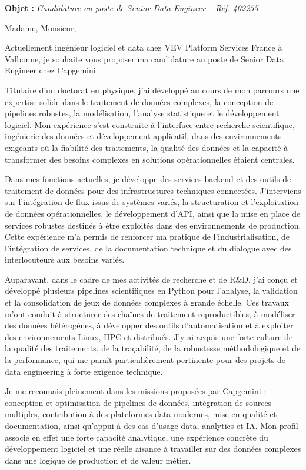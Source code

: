 \documentclass[11pt,a4paper]{altacv}
\begin{document}
\makecvheader

{\color{accent}\textbf{Objet :}} \textit{Candidature au poste de Senior Data Engineer -- Réf. 402255}

{\color{body}

Madame, Monsieur,

Actuellement ingénieur logiciel et data chez VEV Platform Services France à Valbonne, je souhaite vous proposer ma candidature au poste de Senior Data Engineer chez Capgemini.

Titulaire d’un doctorat en physique, j’ai développé au cours de mon parcours une expertise solide dans le traitement de données complexes, la conception de pipelines robustes, la modélisation, l’analyse statistique et le développement logiciel. Mon expérience s’est construite à l’interface entre recherche scientifique, ingénierie des données et développement applicatif, dans des environnements exigeants où la fiabilité des traitements, la qualité des données et la capacité à transformer des besoins complexes en solutions opérationnelles étaient centrales.

Dans mes fonctions actuelles, je développe des services backend et des outils de traitement de données pour des infrastructures techniques connectées. J’interviens sur l’intégration de flux issus de systèmes variés, la structuration et l’exploitation de données opérationnelles, le développement d’API, ainsi que la mise en place de services robustes destinés à être exploités dans des environnements de production. Cette expérience m’a permis de renforcer ma pratique de l’industrialisation, de l’intégration de services, de la documentation technique et du dialogue avec des interlocuteurs aux besoins variés.

Auparavant, dans le cadre de mes activités de recherche et de R\&D, j’ai conçu et développé plusieurs pipelines scientifiques en Python pour l’analyse, la validation et la consolidation de jeux de données complexes à grande échelle. Ces travaux m’ont conduit à structurer des chaînes de traitement reproductibles, à modéliser des données hétérogènes, à développer des outils d’automatisation et à exploiter des environnements Linux, HPC et distribués. J’y ai acquis une forte culture de la qualité des traitements, de la traçabilité, de la robustesse méthodologique et de la performance, qui me paraît particulièrement pertinente pour des projets de data engineering à forte exigence technique.

Je me reconnais pleinement dans les missions proposées par Capgemini : conception et optimisation de pipelines de données, intégration de sources multiples, contribution à des plateformes data modernes, mise en qualité et documentation, ainsi qu’appui à des cas d’usage data, analytics et IA. Mon profil associe en effet une forte capacité analytique, une expérience concrète du développement logiciel et une réelle aisance à travailler sur des données complexes dans une logique de production et de valeur métier.

}
\end{document}
